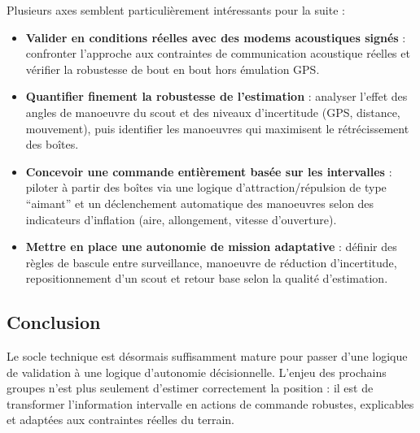 Plusieurs axes semblent particulièrement intéressants pour la suite :
\begin{itemize}
	\item \textbf{Valider en conditions réelles avec des modems acoustiques signés} : confronter l'approche aux contraintes de communication acoustique réelles et vérifier la robustesse de bout en bout hors émulation GPS.
	\item \textbf{Quantifier finement la robustesse de l'estimation} : analyser l'effet des angles de manoeuvre du scout et des niveaux d'incertitude (GPS, distance, mouvement), puis identifier les manoeuvres qui maximisent le rétrécissement des boîtes.
	\item \textbf{Concevoir une commande entièrement basée sur les intervalles} : piloter à partir des boîtes via une logique d'attraction/répulsion de type ``aimant'' et un déclenchement automatique des manoeuvres selon des indicateurs d'inflation (aire, allongement, vitesse d'ouverture).
	\item \textbf{Mettre en place une autonomie de mission adaptative} : définir des règles de bascule entre surveillance, manoeuvre de réduction d'incertitude, repositionnement d'un scout et retour base selon la qualité d'estimation.
\end{itemize}

\subsection{Conclusion}

Le socle technique est désormais suffisamment mature pour passer d'une logique de validation à une logique d'autonomie décisionnelle. L'enjeu des prochains groupes n'est plus seulement d'estimer correctement la position : il est de transformer l'information intervalle en actions de commande robustes, explicables et adaptées aux contraintes réelles du terrain.

